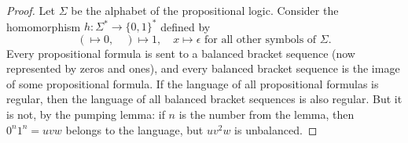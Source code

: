 

\setcounter{section}{3}
\setcounter{subsection}{3}
\setcounter{dfn}{14}

\begin{proof}
Let $\Sigma$ be the alphabet of the propositional logic.
Consider the homomorphism $h \colon \Sigma^* \to \{0, 1\}^*$ defined by
\[
( \mapsto 0, \quad ) \mapsto 1, \quad x \mapsto \epsilon \text{ for all other symbols of }\Sigma.
\]
Every propositional formula is sent to a balanced bracket sequence (now represented by zeros and ones),
and every balanced bracket sequence is the image of some propositional formula.
If the language of all propositional formulas is regular, then the language of all balanced bracket sequences is also regular.
But it is not, by the pumping lemma: if $n$ is the number from the lemma, then $0^n1^n = uvw$ belongs to the language, but $uv^2w$ is unbalanced.
\end{proof}






